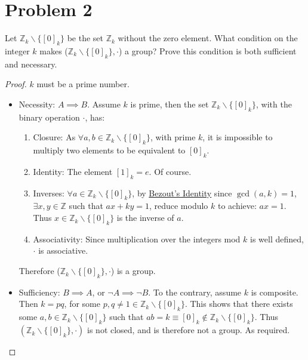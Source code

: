 \documentclass[hidelinks,12pt]{article}
\newcommand{\Z}{\mathbb{Z}}
\begin{document}
\section{Problem 2}
Let $\Z_k\backslash \{[0]_k\}$ be the set $\Z_k$ without the zero element. What condition on the integer $k$ makes ($\Z_k\backslash \{[0]_k\},\cdot$) a group? Prove this condition is both sufficient and necessary.\begin{proof}$k$ must be a prime number.\begin{itemize}
    \item Necessity: $A\implies B$. \newline Assume $k$ is prime, then the set $\Z_k\backslash \{[0]_k\}$, with the binary operation $\cdot$, has:\begin{enumerate}
        \item Closure: As $\forall a,b\in\Z_k\backslash \{[0]_k\}$, with prime $k$, it is impossible to multiply two elements to be equivalent to $[0]_k$.
        \item Identity: The element $[1]_k=e$. Of course.
        \item Inverses: $\forall a\in\Z_k\backslash \{[0]_k\}$, by \href{https://en.wikipedia.org/wiki/B%C3%A9zout%27s_identity}{\color{cyan}Bezout's Identity} since $\gcd(a,k)=1$, $\exists x,y\in\Z$ such that $ax+ky=1$, reduce modulo $k$ to achieve: $ax=1$. Thus $x\in\Z_k\backslash \{[0]_k\}$ is the inverse of $a$.
        \item Associativity: Since multiplication over the integers mod $k$ is well defined, $\cdot$ is associative.
        \end{enumerate}
        Therefore ($\Z_k\backslash \{[0]_k\},\cdot$) is a group.
    \item Sufficiency: $B\implies A$, or $\neg A\implies \neg B$. \newline To the contrary, assume $k$ is composite. Then $k=pq$, for some $p,q\neq1\in\Z_k\backslash \{[0]_k\}$. This shows that there exists some $a,b\in\Z_k\backslash \{[0]_k\}$ such that $ab=k\equiv[0]_k\notin\Z_k\backslash \{[0]_k\}$. Thus $(\Z_k\backslash \{[0]_k\},\cdot)$ is not closed, and is therefore not a group. As required.
\end{itemize}
\end{proof}
\end{document}
